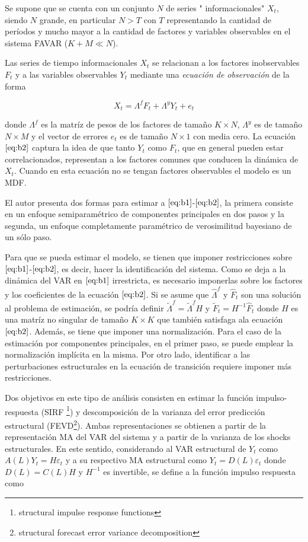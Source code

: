 \documentclass[a4paper,twoside,15pt]{article}
\begin{document}
Se supone que se cuenta con un conjunto $N$ de series " informacionales" $X_t$, siendo $N$ grande, en particular $N>T$ con $T$ representando la cantidad de períodos y mucho mayor a la cantidad de factores y variables observables en el sistema FAVAR ($K+M  \ll N$).

Las series de tiempo informacionales $X_t$ se relacionan a los factores inobservables $F_t$ y a las variables observables $Y_t$ mediante una \textit{ecuación de observación} de la forma


\begin{equation*}
X_t=\Lambda^f F_t +\Lambda^y Y_t + e_t
 \label{eq:b2}\tag{11}
\end{equation*}

donde $\Lambda^f$ es la matríz de pesos de los factores de tamaño $K \times N$, $\Lambda^y$ es de tamaño $N \times M$ y el vector de errores $e_t$ es de tamaño $N \times 1$ con media cero. La ecuación $\eqref{eq:b2}$ captura la idea de que tanto $Y_t$ como $F_t$, que en general pueden estar correlacionados, representan a los factores comunes que conducen la dinámica de $X_t$. Cuando en esta ecuación no se tengan factores observables el modelo es un MDF.

El autor presenta dos formas para estimar a $\eqref{eq:b1}$-$\eqref{eq:b2}$, la primera consiste en un enfoque semiparamétrico de componentes principales en dos pasos y la segunda, un enfoque completamente paramétrico de verosimilitud bayesiano de un sólo paso.


Para que se pueda estimar el modelo, se tienen que imponer restricciones sobre $\eqref{eq:b1}$-$\eqref{eq:b2}$, es decir, hacer la identificación del sistema. Como se deja a la dinámica del VAR en $\eqref{eq:b1}$ irrestricta, es necesario imponerlas sobre los factores y los coeficientes de la ecuación $\eqref{eq:b2}$. Si se asume que $\hat{\Lambda}^f$ y $\hat{F}_t$ son una solución al problema de estimación, se podría definir $\tilde{\Lambda}^f=\tilde{\Lambda}^fH$  y $\tilde{F}_t=H^{-1}\hat{F}_t$ donde $H$ es una matríz no singular de tamaño $K \times K$ que también satisfaga ala ecuación $\eqref{eq:b2}$. Además, se tiene que imponer una normalización. Para el caso de la estimación por componentes principales, en el primer paso, se puede emplear la normalización implícita en la misma. Por otro lado, identificar a las perturbaciones estructurales en la ecuación de transición requiere imponer más restricciones. 

Dos objetivos en este tipo de análisis consisten en estimar la función impulso-respuesta (SIRF \footnote{structural impulse response functions}) y descomposición de la varianza del error predicción estructural (FEVD\footnote{structural forecast error variance decomposition}). Ambas representaciones se obtienen a partir de la representación MA del VAR del sistema y a partir de la varianza de los shocks estructurales. En este sentido, considerando al VAR estructural de $Y_t$ como $A(L)Y_t=H\varepsilon_t$ y a su respectivo MA estructural como $Y_t=D(L)\varepsilon_t$ donde $D(L)=C(L)H$ y $H^{-1}$ es invertible, se define a la función impulso respuesta como
\end{document}
